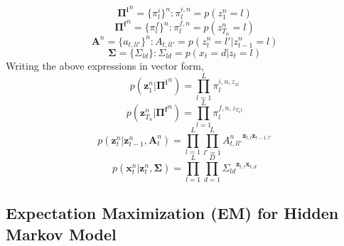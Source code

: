 \documentclass[10pt]{article}
\begin{document}
\begin{equation}
\mathbf{\Pi^i}^n = \{\pi_l^i\}^n : \pi_l^{i,n} = p(z_1^n = l)
\end{equation}
\begin{equation}
\mathbf{\Pi^f}^n = \{\pi_l^f\}^n : \pi_l^{f,n} = p(z_{T_n}^n = l)
\end{equation}
\begin{equation}
\mathbf{A}^n = \{a_{t,ll'}\}^n : A_{t,ll'} = p(z_t^n = l' | z_{t-1}^n = l)
\end{equation}
\begin{equation}
\mathbf{\Sigma} = \{\Sigma_{ld}\} : \Sigma_{ld} = p(x_t = d | z_t = l)
\end{equation}
Writing the above expressions in vector form,
\begin{equation}
p(\mathbf{z}_1^n|\mathbf{\Pi^i}^n) = \displaystyle\prod_{l=1}^{L} \pi_l^{i,n,z_{1l}}
\end{equation}
\begin{equation}
p(\mathbf{z}_{T_n}^n|\mathbf{\Pi^f}^n) = \displaystyle\prod_{l=1}^{L} \pi_l^{f,n,z_{T_n l}}
\end{equation}
\begin{equation}
p(\mathbf{z}_{t}^n|\mathbf{z}_{t-1}^n,\mathbf{A}_t^n) = \displaystyle\prod_{l=1}^{L}\prod_{l'=1}^{L} {A_{t,ll'}^n}^{\mathbf{z}_{t,l}\mathbf{z}_{t-1,l'}}
\end{equation}
\begin{equation}
p(\mathbf{x}_{t}^n|\mathbf{z}_{t}^n,\mathbf{\Sigma}) = \displaystyle\prod_{l=1}^{L}\prod_{d=1}^{D} {\Sigma_{ld}}^{\mathbf{z}_{t,l}\mathbf{x}_{t,d}}
\end{equation}

\subsection{Expectation Maximization (EM) for Hidden Markov Model}
\end{document}
